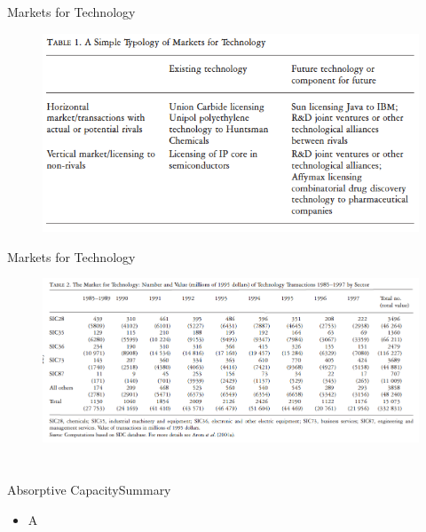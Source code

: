 \documentclass{beamer}
\begin{document}
\begin{frame}{Markets for Technology}{}
\begin{figure}[h]
\begin{centering}
  \includegraphics[width=\textwidth]{0301}
   \label{fig:0301}
\end{centering}
\end{figure}
\end{frame}

\begin{frame}{Markets for Technology}{}
\begin{figure}[h]
\begin{centering}
  \includegraphics[width=\textwidth]{0302}
   \label{fig:0302}
\end{centering}
\end{figure}
\end{frame}

\section{\cite{Cohen1990}}
\begin{frame}{Absorptive Capacity}{Summary}
\begin{itemize}
\item{A}
\end{itemize}
\end{frame}
\end{document}
